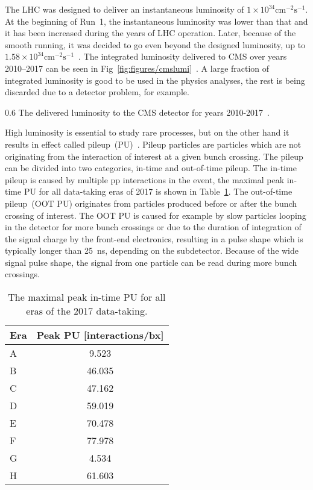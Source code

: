 The LHC was designed to deliver an instantaneous luminosity of $1 \times 10^{34} \mathrm{cm^{-2}s^{-1}}$. At the beginning of Run~1, the instantaneous luminosity was lower than that and it has been increased during the years of LHC operation. Later, because of the smooth running, it was decided to go even beyond the designed luminosity, up to $1.58 \times 10^{34} \mathrm{cm^{-2}s^{-1}}$~\cite{Pralavorio:2272474}. The integrated luminosity delivered to CMS over years 2010--2017 can be seen in Fig~\ref{fig:figures/cmslumi}~\cite{website:CMSlumi}. A large fraction of integrated luminosity is good to be used in the physics analyses, the rest is being discarded due to a detector problem, for example. 


                 {0.6}       %
                 { The delivered luminosity to the CMS detector for years 2010-2017~\cite{website:CMSlumi}. }


High luminosity is essential to study rare processes, but on the other hand it results in effect called pileup~(PU)~\cite{Bayatian:2006nff}. Pileup particles are particles which are not originating from the interaction of interest at a given bunch crossing. The pileup can be divided into two categories, in-time and out-of-time pileup. The in-time pileup is caused by multiple pp interactions in the event, the maximal peak in-time PU for all data-taking eras of 2017 is shown in Table~\ref{tab:PU}.  The out-of-time pileup~(OOT PU) originates from particles produced before or after the bunch crossing of interest. The OOT PU is caused for example by slow particles looping in the detector for more bunch crossings or due to the duration of integration of the signal charge by the front-end electronics, resulting in a pulse shape which is typically longer than 25~ns, depending on the subdetector. Because of the wide signal pulse shape, the signal from one particle can be read during more bunch crossings.

\begin{table}[h]
\begin{center}
\begin{tabular}{|l|c|}
\hline
Era & Peak PU [interactions/bx]  \\
\hline
A & 9.523  \\
B & 46.035  \\
C & 47.162  \\
D & 59.019  \\
E & 70.478  \\
F & 77.978  \\
G & 4.534  \\
H & 61.603  \\
\hline
\end{tabular}
\caption[Table caption text]{The maximal peak in-time PU for all eras of the 2017 data-taking. }
\label{tab:PU}
\end{center}
\end{table}
\newpage

